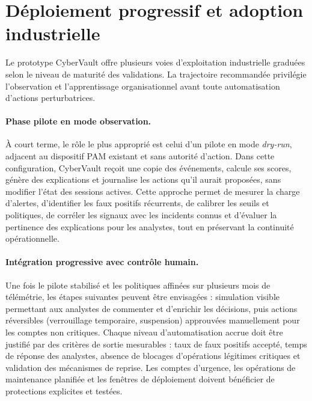 \documentclass[11pt,a4paper,oneside]{report}
\theoremstyle{definition}
\theoremstyle{plain}
\begin{document}
\section{Déploiement progressif et adoption industrielle}
\label{sec:validation-roadmap}

Le prototype CyberVault offre plusieurs voies d'exploitation industrielle graduées selon le niveau de maturité des validations. La trajectoire recommandée privilégie l'observation et l'apprentissage organisationnel avant toute automatisation d'actions perturbatrices.

\paragraph{Phase pilote en mode observation.} À court terme, le rôle le plus approprié est celui d'un pilote en mode \emph{dry-run}, adjacent au dispositif PAM existant et sans autorité d'action. Dans cette configuration, CyberVault reçoit une copie des événements, calcule ses scores, génère des explications et journalise les actions qu'il aurait proposées, sans modifier l'état des sessions actives. Cette approche permet de mesurer la charge d'alertes, d'identifier les faux positifs récurrents, de calibrer les seuils et politiques, de corréler les signaux avec les incidents connus et d'évaluer la pertinence des explications pour les analystes, tout en préservant la continuité opérationnelle.

\paragraph{Intégration progressive avec contrôle humain.} Une fois le pilote stabilisé et les politiques affinées sur plusieurs mois de télémétrie, les étapes suivantes peuvent être envisagées : simulation visible permettant aux analystes de commenter et d'enrichir les décisions, puis actions réversibles (verrouillage temporaire, suspension) approuvées manuellement pour les comptes non critiques. Chaque niveau d'automatisation accrue doit être justifié par des critères de sortie mesurables : taux de faux positifs accepté, temps de réponse des analystes, absence de blocages d'opérations légitimes critiques et validation des mécanismes de reprise. Les comptes d'urgence, les opérations de maintenance planifiée et les fenêtres de déploiement doivent bénéficier de protections explicites et testées.
\end{document}
